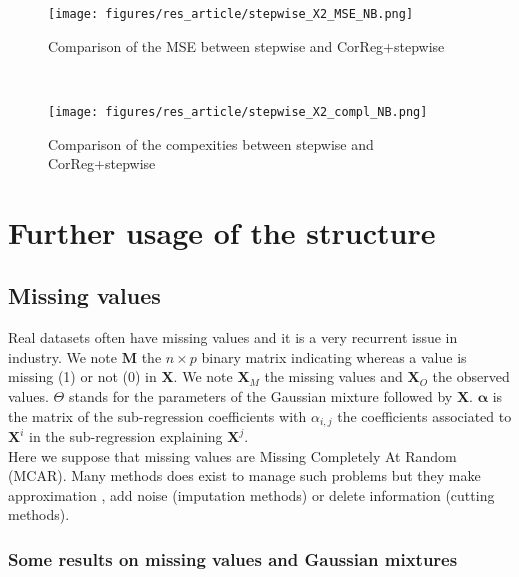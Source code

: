 \documentclass[11pt,a4paper]{report}
\begin{document}
 \begin{figure}[h!]
	\begin{minipage}[l]{.48\linewidth}
			\texttt{[image: figures/res\_article/stepwise\_X2\_MSE\_NB.png]} 
			\caption{Comparison of the MSE between stepwise and CorReg+stepwise}
	\end{minipage} \
   \begin{minipage}[r]{.48\linewidth}
			\texttt{[image: figures/res\_article/stepwise\_X2\_compl\_NB.png]} 
			\caption{Comparison of the compexities between stepwise and CorReg+stepwise}
   \end{minipage}
\end{figure}



\part{Further usage of the structure}	
\chapter{Missing values}
	Real datasets often have missing values and it is a very recurrent issue in industry. We note $\boldsymbol{M}$ the $n\times p$ binary matrix indicating whereas a value is missing (1) or not (0) in $\boldsymbol{X}$.
	We note $\boldsymbol{X}_M$ the missing values and $\boldsymbol{X}_{O}$ the observed values. $\Theta$ stands for the parameters of the Gaussian mixture followed by $\boldsymbol{X}$.
	$\boldsymbol{\alpha}$ is the matrix of the sub-regression coefficients with $\alpha_{i,j}$ the coefficients associated to $\boldsymbol{X}^i$ in the sub-regression explaining $\boldsymbol{X}^j$.\\ 
			Here we suppose that missing values are Missing Completely At Random (MCAR). 
	 Many methods does exist to manage such problems \cite{little1992regression} but they make approximation , add noise (imputation methods) or delete information (cutting methods).	
\section{Some results on missing values and Gaussian mixtures}
\end{document}
